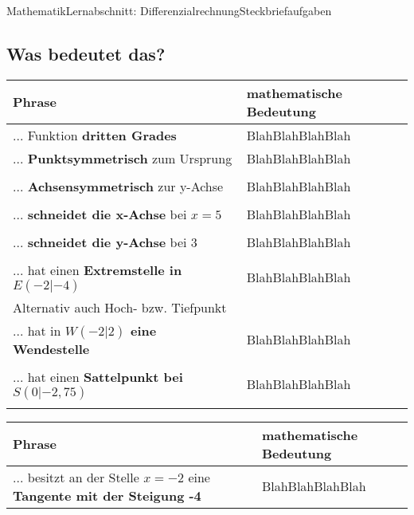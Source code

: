 \documentclass[11pt,oneside,openany,headings=optiontotoc,11pt,numbers=noenddot]{article}
\begin{document}
	\begin{worksheet}{Mathematik}{Lernabschnitt: Differenzialrechnung}{Steckbriefaufgaben}
		\noindent
		\setcounter{section}{7}
		\setcounter{subsection}{5}
		\vspace*{-25pt}
		\subsection{Was bedeutet das?}
		\renewcommand{\arraystretch}{1.5}
		\begin{tabularx}{\textwidth}{|L{5cm}|X|}
			\hline
			 \textbf{Phrase} & \textbf{mathematische Bedeutung}\\
			\hline
			\hline
			... Funktion \textbf{dritten Grades} & \color{white}BlahBlahBlahBlah\\
			\hline
			... \textbf{Punktsymmetrisch} zum Ursprung & \color{white}BlahBlahBlahBlah\\
			& \\
			\hline
			... \textbf{Achsensymmetrisch} zur y-Achse & \color{white}BlahBlahBlahBlah\\
			& \\
			\hline
			... \textbf{schneidet die x-Achse} bei \(x = 5\) & \color{white}BlahBlahBlahBlah\\
			& \\
			\hline
			... \textbf{schneidet die y-Achse} bei \(3\) & \color{white}BlahBlahBlahBlah\\
			& \\
			\hline
			... hat einen \textbf{Extremstelle in \(E(-2|-4)\)} & \color{white}BlahBlahBlahBlah\\
			\footnotesize{Alternativ auch Hoch- bzw. Tiefpunkt} & \normalsize\\
			\hline
			... hat in \textbf{\(W(-2|2)\) eine Wendestelle} & \color{white}BlahBlahBlahBlah\\
			& \\
			\hline
			... hat einen \textbf{Sattelpunkt bei \(S(0|-2,75)\)} & \color{white}BlahBlahBlahBlah\\
			& \\
			\hline
		\end{tabularx}
		\begin{tabularx}{\textwidth}{|L{5cm}|X|}
			\hline
			 \textbf{Phrase} & \textbf{mathematische Bedeutung}\\
			\hline
			\hline
			... besitzt an der Stelle \(x = -2\) eine \textbf{Tangente mit der Steigung -4} & \color{white}BlahBlahBlahBlah\\

\end{tabularx}
\end{worksheet}
\end{document}

